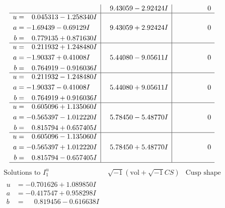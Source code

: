 \documentclass[1p]{elsarticle_modified}
\theoremstyle{definition}
\newcommand{\I}{\sqrt{-1}}
\begin{document}
$$\begin{array}{c|c|c}
 & \phantom{-}9.43059 - 2.92424 I & \phantom{-0.000000 } 0 \\ \hline\begin{aligned}
u &= \phantom{-}0.045313 - 1.258340 I \\
a &= -1.69439 - 0.69129 I \\
b &= \phantom{-}0.779135 + 0.871630 I\end{aligned}
 & \phantom{-}9.43059 + 2.92424 I & \phantom{-0.000000 } 0 \\ \hline\begin{aligned}
u &= \phantom{-}0.211932 + 1.248480 I \\
a &= -1.90337 + 0.41008 I \\
b &= \phantom{-}0.764919 - 0.916036 I\end{aligned}
 & \phantom{-}5.44080 - 9.05611 I & \phantom{-0.000000 } 0 \\ \hline\begin{aligned}
u &= \phantom{-}0.211932 - 1.248480 I \\
a &= -1.90337 - 0.41008 I \\
b &= \phantom{-}0.764919 + 0.916036 I\end{aligned}
 & \phantom{-}5.44080 + 9.05611 I & \phantom{-0.000000 } 0 \\ \hline\begin{aligned}
u &= \phantom{-}0.605096 + 1.135060 I \\
a &= -0.565397 - 1.012220 I \\
b &= \phantom{-}0.815794 + 0.657405 I\end{aligned}
 & \phantom{-}5.78450 - 5.48770 I & \phantom{-0.000000 } 0 \\ \hline\begin{aligned}
u &= \phantom{-}0.605096 - 1.135060 I \\
a &= -0.565397 + 1.012220 I \\
b &= \phantom{-}0.815794 - 0.657405 I\end{aligned}
 & \phantom{-}5.78450 + 5.48770 I & \phantom{-0.000000 } 0\\
 \hline 
 \end{array}$$\newpage$$\begin{array}{c|c|c}  
\text{Solutions to }I^u_{1}& \I (\text{vol} + \sqrt{-1}CS) & \text{Cusp shape}\\
 \hline 
\begin{aligned}
u &= -0.701626 + 1.089850 I \\
a &= -0.417547 + 0.958298 I \\
b &= \phantom{-}0.819456 - 0.616638 I\end{aligned}

\end{array}$$
\end{document}
